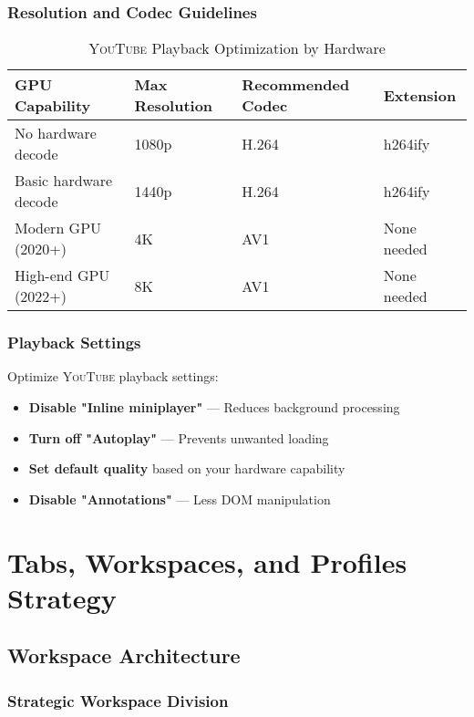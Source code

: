 \documentclass[11pt,a4paper,oneside]{book}
\newcommand{\youtube}{\textsc{YouTube}}
\begin{document}
\subsection{Resolution and Codec Guidelines}

\begin{table}[h]
\centering
\begin{tabular}{@{}llll@{}}
\toprule
\textbf{GPU Capability} & \textbf{Max Resolution} & \textbf{Recommended Codec} & \textbf{Extension} \\
\midrule
No hardware decode & 1080p & H.264 & h264ify \\
Basic hardware decode & 1440p & H.264 & h264ify \\
Modern GPU (2020+) & 4K & AV1 & None needed \\
High-end GPU (2022+) & 8K & AV1 & None needed \\
\bottomrule
\end{tabular}
\caption{\youtube{} Playback Optimization by Hardware}
\end{table}

\subsection{Playback Settings}

Optimize \youtube{} playback settings:

\begin{itemize}
    \item \textbf{Disable "Inline miniplayer"} — Reduces background processing
    \item \textbf{Turn off "Autoplay"} — Prevents unwanted loading
    \item \textbf{Set default quality} based on your hardware capability
    \item \textbf{Disable "Annotations"} — Less DOM manipulation
\end{itemize}

\chapter{Tabs, Workspaces, and Profiles Strategy}

\section{Workspace Architecture}

\subsection{Strategic Workspace Division}
\end{document}
